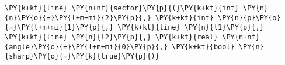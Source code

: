 \begin{Verbatim}[commandchars=\\\{\}]
    \PY{k+kt}{line} \PY{n+nf}{sector}\PY{p}{(}\PY{k+kt}{int} \PY{n}{n}\PY{o}{=}\PY{l+m+mi}{2}\PY{p}{,} \PY{k+kt}{int} \PY{n}{p}\PY{o}{=}\PY{l+m+mi}{1}\PY{p}{,} \PY{k+kt}{line} \PY{n}{l1}\PY{p}{,} \PY{k+kt}{line} \PY{n}{l2}\PY{p}{,} \PY{k+kt}{real} \PY{n+nf}{angle}\PY{o}{=}\PY{l+m+mi}{0}\PY{p}{,} \PY{k+kt}{bool} \PY{n}{sharp}\PY{o}{=}\PY{k}{true}\PY{p}{)}
\end{Verbatim}
